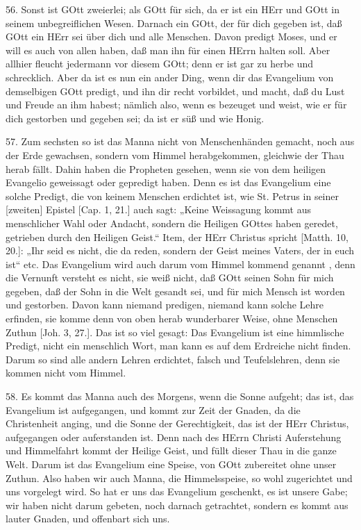 56. Sonst ist GOtt zweierlei; als GOtt für sich, da er ist ein HErr und GOtt in seinem unbegreiflichen Wesen. Darnach ein GOtt, der für dich gegeben ist, daß GOtt ein HErr sei über dich und alle Menschen. Davon predigt Moses, und er will es auch von allen haben, daß man ihn für einen HErrn halten soll. Aber allhier fleucht jedermann vor diesem GOtt; denn er ist gar zu herbe und schrecklich. Aber da ist es nun ein ander Ding, wenn dir das Evangelium von demselbigen GOtt predigt, und ihn dir recht vorbildet, und macht, daß du Lust und Freude an ihm habest; nämlich also, wenn es bezeuget und weist, wie er für dich gestorben und gegeben sei; da ist er süß und wie Honig.

57. Zum sechsten so ist das Manna nicht von Menschenhänden gemacht, noch aus der Erde gewachsen, sondern vom Himmel herabgekommen, gleichwie der Thau herab fällt. Dahin haben die Propheten gesehen, wenn sie von dem heiligen Evangelio geweissagt oder gepredigt haben. Denn es ist das Evangelium eine solche Predigt, die von keinem Menschen erdichtet ist, wie St. Petrus in seiner [zweiten] Epistel [Cap. 1, 21.] auch sagt: „Keine Weissagung kommt aus menschlicher Wahl oder Andacht, sondern die Heiligen GOttes haben geredet, getrieben durch den Heiligen Geist.“ Item, der HErr Christus spricht [Matth. 10, 20.]: „Ihr seid es nicht, die da reden, sondern der Geist meines Vaters, der in euch ist“ etc. Das Evangelium wird auch darum vom Himmel kommend genannt
, denn die Vernunft versteht es nicht, sie weiß nicht, daß GOtt seinen Sohn für mich gegeben, daß der Sohn in die Welt gesandt sei, und für mich Mensch ist worden und gestorben. Davon kann niemand predigen, niemand kann solche Lehre erfinden, sie komme denn von oben herab wunderbarer Weise, ohne Menschen Zuthun [Joh. 3, 27.]. Das ist so viel gesagt: Das Evangelium ist eine himmlische Predigt, nicht ein menschlich Wort, man kann es auf dem Erdreiche nicht finden. Darum so sind alle andern Lehren erdichtet, falsch und Teufelslehren, denn sie kommen nicht vom Himmel.

58. Es kommt das Manna auch des Morgens, wenn die Sonne aufgeht; das ist, das Evangelium ist aufgegangen, und kommt zur Zeit der Gnaden, da die Christenheit anging, und die Sonne der Gerechtigkeit, das ist der HErr Christus, aufgegangen oder auferstanden ist. Denn nach des HErrn Christi Auferstehung und Himmelfahrt kommt der Heilige Geist, und füllt dieser Thau in die ganze Welt. Darum ist das Evangelium eine Speise, von GOtt zubereitet ohne unser Zuthun. Also haben wir auch Manna, die Himmelsspeise, so wohl zugerichtet und uns vorgelegt wird. So hat er uns das Evangelium geschenkt, es ist unsere Gabe; wir haben nicht darum gebeten, noch darnach getrachtet, sondern es kommt aus lauter Gnaden, und offenbart sich uns.

